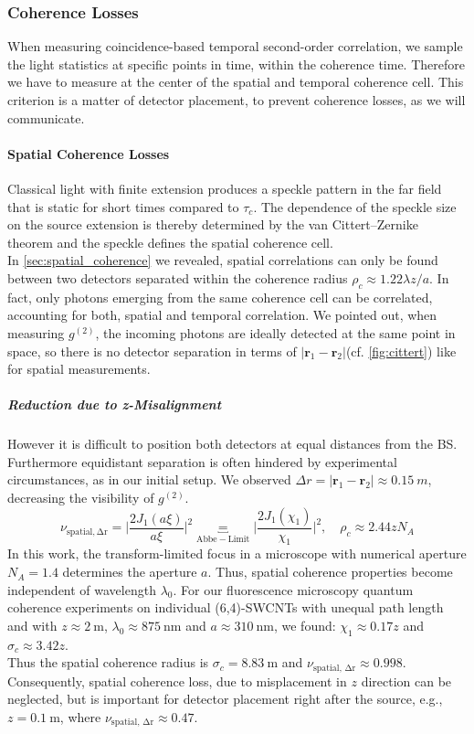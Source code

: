 \subsubsection{Coherence Losses} When measuring coincidence-based temporal second-order correlation, we sample the light statistics at specific points in time, within the coherence time. Therefore we have to measure at the center of the spatial and temporal coherence cell. This criterion is a matter of detector placement, to prevent coherence losses, as we will communicate.

\paragraph{Spatial Coherence Losses} Classical light with finite extension produces a speckle pattern in the far field that is static for short times compared to $\tau_c$. The dependence of the speckle size on the source extension is thereby determined by the van Cittert--Zernike theorem and the speckle defines the spatial coherence cell.\\
In \cref{sec:spatial_coherence} we revealed, spatial correlations can only be found between two detectors separated within the coherence radius $\rho_c\approx 1.22 \lambda z/a$. In fact, only photons emerging from the same coherence cell can be correlated, accounting for both, spatial and temporal correlation. We pointed out, when measuring $g^{(2)}$, the incoming photons are ideally detected at the same point in space, so there is no detector separation in terms of $|\boldsymbol{r}_1-\boldsymbol{r}_2|$(cf. \cref{fig:cittert}) like for spatial measurements. 

\subparagraph{Reduction due to z-Misalignment} However it is difficult to position both detectors at equal distances from the \ac{BS}. Furthermore equidistant separation is often hindered by experimental circumstances, as in our initial setup. We observed $\Delta r=|\boldsymbol{r}_1-\boldsymbol{r}_2|\approx \SI{0.15}{m}$, decreasing the visibility of $g^{(2)}$.
\begin{equation}\label{eq:g2coherencelossz}
\nu_\mathrm{spatial,\Delta r}=\Big|\dfrac{2J_1(a\xi)}{a\xi}\Big|^2\underbracket{=}_\mathrm{Abbe-Limit}\Big|\dfrac{2J_1(\chi_1)}{\chi_1}\Big|^2,\quad \rho_c\approx 2.44zN_A
\end{equation}
In this work, the transform-limited focus in a microscope with numerical aperture $N_A=1.4$ determines the aperture $a$. Thus, spatial coherence properties become independent of wavelength $\lambda_0$. For our fluorescence microscopy quantum coherence experiments on individual (6,4)-\acp{SWCNT} with unequal path length and with $z\approx\SI{2}{\m}$, $\lambda_0\approx\SI{875}{\nm}$ and $a\approx\SI{310}{\nm}$, we found: $\chi_1\approx0.17z$ and $\sigma_c\approx3.42z$.\\
Thus the spatial coherence radius is $\sigma_c=\SI{8.83}{\m}$ and $\nu_\mathrm{spatial,\,\Delta r}\approx 0.998$. Consequently, spatial coherence loss, due to misplacement in $z$ direction can be neglected, but is important for detector placement right after the source, e.g., $z=\SI{0.1}{\m}$, where $\nu_\mathrm{spatial,\,\Delta r}\approx 0.47$.

